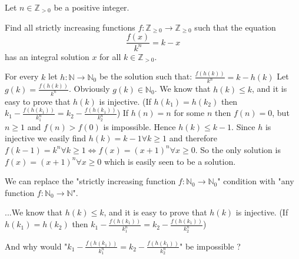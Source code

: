 \begin{solution}
	\begin{tcolorbox}Let $ n \in \mathbb{Z}_{ > 0}$ be a positive integer.

Find all strictly increasing functions $ f: \mathbb{Z}_{\geq 0} \rightarrow \mathbb{Z}_{\geq 0}$ such that the equation
\[ \frac {f(x)}{k^n} = k - x\]
has an integral solution $ x$ for all $ k \in \mathbb{Z}_{ > 0}$.\end{tcolorbox}
For every $ k$ let $ h : \mathbb{N} \to \mathbb{N}_0$ be the solution such that:
$ \frac {f(h(k))}{k^n} = k - h(k)$
Let $ g(k) = \frac {f(h(k))}{k^n}$. Obviously $ g(k) \in \mathbb{N}_0$.
We know that $ h(k) \le k$, and it is easy to prove that $ h(k)$ is injective. (If $ h(k_1) = h(k_2)$ then $ k_1 - \frac {f(h(k_1))}{k_1^n} = k_2 - \frac {f(h(k_1))}{k_2^n}$)
If $ h(n) = n$ for some $ n$ then $ f(n) = 0$, but $ n \ge 1$ and $ f(n) > f(0)$ is impossible. Hence $ h(k) \le k - 1$. Since $ h$ is injective we easily find $ h(k) = k - 1 \forall k \ge 1$ and therefore $ f(k - 1) = k^n \forall k \ge 1 \iff f(x) = (x + 1)^n \forall x \ge 0$.
So the only solution is $ f(x) = (x + 1)^n \forall x \ge 0$ which is easily seen to be a solution.

We can replace the "strictly increasing function $ f : \mathbb{N}_0 \to \mathbb{N}_0$" condition with "any function $ f : \mathbb{N}_0 \to \mathbb{N}$".
\end{solution}



\begin{solution}
	\begin{tcolorbox} ...We know that $ h(k) \le k$, and it is easy to prove that $ h(k)$ is injective. (If $ h(k_1) = h(k_2)$ then $ k_1 - \frac {f(h(k_1))}{k_1^n} = k_2 - \frac {f(h(k_1))}{k_2^n}$)
\end{tcolorbox}

And why would "$ k_1 - \frac {f(h(k_1))}{k_1^n} = k_2 - \frac {f(h(k_1))}{k_2^n}$" be impossible ?
\end{solution}






